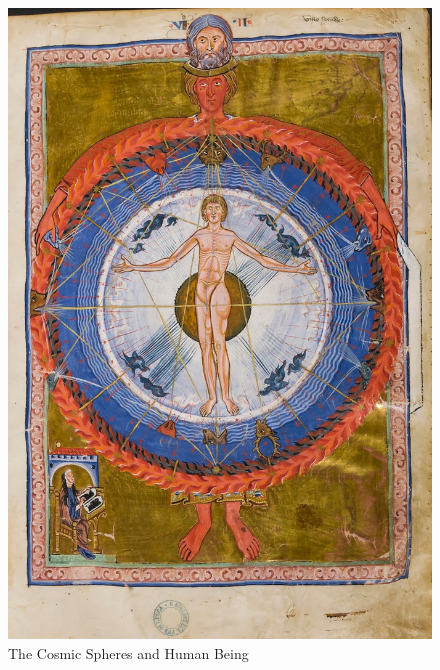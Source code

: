 \documentclass{turabian-researchpaper}
\begin{document}
\begin{figure}
    \includegraphics[scale=0.4]{liber.jpg}
    \caption{The Cosmic Spheres and Human Being\autocite{ISHVBS}}
    \label{The Cosmic Spheres}
\end{figure}
\end{document}
